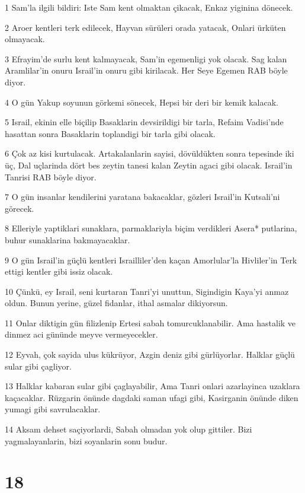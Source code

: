 \par 1 Sam'la ilgili bildiri: Iste Sam kent olmaktan çikacak, Enkaz yiginina dönecek.
\par 2 Aroer kentleri terk edilecek, Hayvan sürüleri orada yatacak, Onlari ürküten olmayacak.
\par 3 Efrayim'de surlu kent kalmayacak, Sam'in egemenligi yok olacak. Sag kalan Aramlilar'in onuru Israil'in onuru gibi kirilacak. Her Seye Egemen RAB böyle diyor.
\par 4 O gün Yakup soyunun görkemi sönecek, Hepsi bir deri bir kemik kalacak.
\par 5 Israil, ekinin elle biçilip Basaklarin devsirildigi bir tarla, Refaim Vadisi'nde hasattan sonra Basaklarin toplandigi bir tarla gibi olacak.
\par 6 Çok az kisi kurtulacak. Artakalanlarin sayisi, dövüldükten sonra tepesinde iki üç, Dal uçlarinda dört bes zeytin tanesi kalan Zeytin agaci gibi olacak. Israil'in Tanrisi RAB böyle diyor.
\par 7 O gün insanlar kendilerini yaratana bakacaklar, gözleri Israil'in Kutsali'ni görecek.
\par 8 Elleriyle yaptiklari sunaklara, parmaklariyla biçim verdikleri Asera* putlarina, buhur sunaklarina bakmayacaklar.
\par 9 O gün Israil'in güçlü kentleri Israilliler'den kaçan Amorlular'la Hivliler'in Terk ettigi kentler gibi issiz olacak.
\par 10 Çünkü, ey Israil, seni kurtaran Tanri'yi unuttun, Sigindigin Kaya'yi anmaz oldun. Bunun yerine, güzel fidanlar, ithal asmalar dikiyorsun.
\par 11 Onlar diktigin gün filizlenip Ertesi sabah tomurcuklanabilir. Ama hastalik ve dinmez aci gününde meyve vermeyecekler.
\par 12 Eyvah, çok sayida ulus kükrüyor, Azgin deniz gibi gürlüyorlar. Halklar güçlü sular gibi çagliyor.
\par 13 Halklar kabaran sular gibi çaglayabilir, Ama Tanri onlari azarlayinca uzaklara kaçacaklar. Rüzgarin önünde dagdaki saman ufagi gibi, Kasirganin önünde diken yumagi gibi savrulacaklar.
\par 14 Aksam dehset saçiyorlardi, Sabah olmadan yok olup gittiler. Bizi yagmalayanlarin, bizi soyanlarin sonu budur.

\chapter{18}

